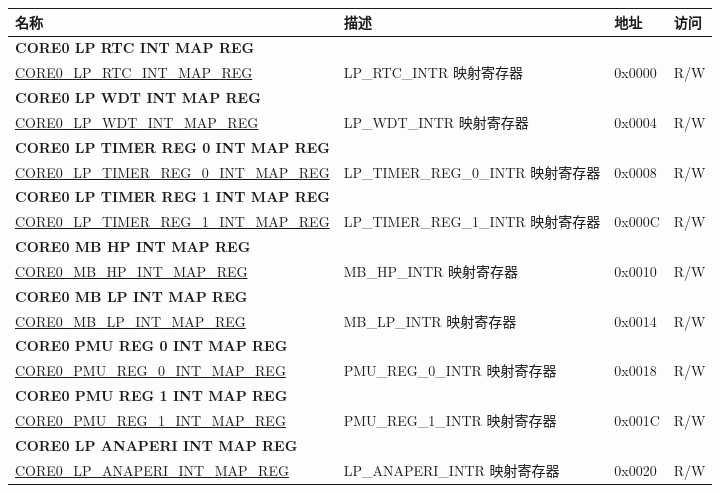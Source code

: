 \begin{longtable}{ | p{8.7cm} | p{6.2cm} | p{1.3cm} | p{1cm} | }
\hline\rowcolor{lightgray}
名称 & 描述 &  地址 & 访问 \\ \hline
\endhead
\multicolumn{4}{|l|}{\textbf{CORE0 LP RTC INT MAP REG}} \\ \hline
\hyperref[regdesc:CORE0LPRTCINTMAPREG]{CORE0\_LP\_RTC\_INT\_MAP\_REG} & LP\_RTC\_INTR 映射寄存器 & 0x0000 & R/W \\ \hline
\multicolumn{4}{|l|}{\textbf{CORE0 LP WDT INT MAP REG}} \\ \hline
\hyperref[regdesc:CORE0LPWDTINTMAPREG]{CORE0\_LP\_WDT\_INT\_MAP\_REG} & LP\_WDT\_INTR 映射寄存器 & 0x0004 & R/W \\ \hline
\multicolumn{4}{|l|}{\textbf{CORE0 LP TIMER REG 0 INT MAP REG}} \\ \hline
\hyperref[regdesc:CORE0LPTIMERREG0INTMAPREG]{CORE0\_LP\_TIMER\_REG\_0\_INT\_MAP\_REG} & LP\_TIMER\_REG\_0\_INTR 映射寄存器 & 0x0008 & R/W \\ \hline
\multicolumn{4}{|l|}{\textbf{CORE0 LP TIMER REG 1 INT MAP REG}} \\ \hline
\hyperref[regdesc:CORE0LPTIMERREG1INTMAPREG]{CORE0\_LP\_TIMER\_REG\_1\_INT\_MAP\_REG} & LP\_TIMER\_REG\_1\_INTR 映射寄存器 & 0x000C & R/W \\ \hline
\multicolumn{4}{|l|}{\textbf{CORE0 MB HP INT MAP REG}} \\ \hline
\hyperref[regdesc:CORE0MBHPINTMAPREG]{CORE0\_MB\_HP\_INT\_MAP\_REG} & MB\_HP\_INTR 映射寄存器 & 0x0010 & R/W \\ \hline
\multicolumn{4}{|l|}{\textbf{CORE0 MB LP INT MAP REG}} \\ \hline
\hyperref[regdesc:CORE0MBLPINTMAPREG]{CORE0\_MB\_LP\_INT\_MAP\_REG} & MB\_LP\_INTR 映射寄存器 & 0x0014 & R/W \\ \hline
\multicolumn{4}{|l|}{\textbf{CORE0 PMU REG 0 INT MAP REG}} \\ \hline
\hyperref[regdesc:CORE0PMUREG0INTMAPREG]{CORE0\_PMU\_REG\_0\_INT\_MAP\_REG} & PMU\_REG\_0\_INTR 映射寄存器 & 0x0018 & R/W \\ \hline
\multicolumn{4}{|l|}{\textbf{CORE0 PMU REG 1 INT MAP REG}} \\ \hline
\hyperref[regdesc:CORE0PMUREG1INTMAPREG]{CORE0\_PMU\_REG\_1\_INT\_MAP\_REG} & PMU\_REG\_1\_INTR 映射寄存器 & 0x001C & R/W \\ \hline
\multicolumn{4}{|l|}{\textbf{CORE0 LP ANAPERI INT MAP REG}} \\ \hline
\hyperref[regdesc:CORE0LPANAPERIINTMAPREG]{CORE0\_LP\_ANAPERI\_INT\_MAP\_REG} & LP\_ANAPERI\_INTR 映射寄存器 & 0x0020 & R/W \\ \hline

\end{longtable}
